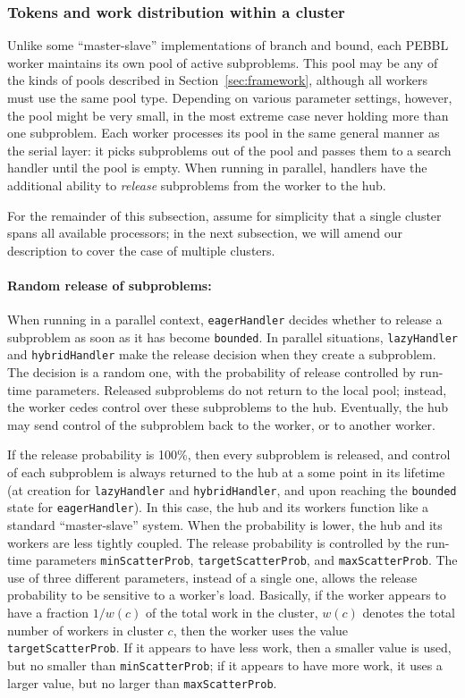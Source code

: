 \subsubsection{Tokens and work distribution within a cluster}
\label{sec:withincluster}
Unlike some ``master-slave'' implementations of branch and bound, each
PEBBL worker maintains its own pool of active subproblems.  This pool
may be any of the kinds of pools described in
Section~\ref{sec:framework}, although all workers must use the same pool
type.  Depending on various parameter settings, however,
the pool might be very small, in the most extreme case never holding more
than one subproblem.  Each worker processes its pool in the same
general manner as the serial layer: it picks subproblems out of the
pool and passes them to a search handler until the pool is empty.
When running in parallel, handlers have the additional ability to
\emph{release} subproblems from the worker to the hub.

For the remainder of this subsection, assume for simplicity that a
single cluster spans all available processors; in the next subsection,
we will amend our description to cover the case of multiple clusters.

\paragraph{Random release of subproblems:}
When running in a parallel context, \texttt{eagerHandler} decides
whether to release a subproblem as soon as it has become
\texttt{bounded}.  In parallel situations, \texttt{lazyHandler} and
\texttt{hybridHandler} make the release decision when they create a
subproblem.  The decision is a random one, with the probability of
release controlled by run-time parameters.  Released subproblems do
not return to the local pool; instead, the worker cedes control over
these subproblems to the hub.  Eventually, the hub may send control of
the subproblem back to the worker, or to another worker.

If the release probability is 100\%, then every subproblem is
released, and control of each subproblem is always returned to the hub at
a some point in its lifetime (at creation for \texttt{lazyHandler}
and \texttt{hybridHandler}, and upon reaching the \texttt{bounded} state
for \texttt{eagerHandler}).  In this case, the hub and its workers
function like a standard ``master-slave'' system.  When the
probability is lower, the hub and its workers are less tightly
coupled.  The release probability is controlled by the run-time
parameters \texttt{minScatterProb}, \texttt{targetScatterProb}, and
\texttt{maxScatterProb}.  The use of three different parameters,
instead of a single one, allows the release probability to be
sensitive to a worker's load.  Basically, if the worker appears to
have a fraction $1/w(c)$ of the total work in the cluster, $w(c)$
denotes the total number of workers in 
cluster $c$, then the worker uses the value \texttt{targetScatterProb}.
If it appears to have less work, then a smaller value is used, but no
smaller than \texttt{minScatterProb}; if it appears to have more work,
it uses a larger value, but no larger than \texttt{maxScatterProb}.

